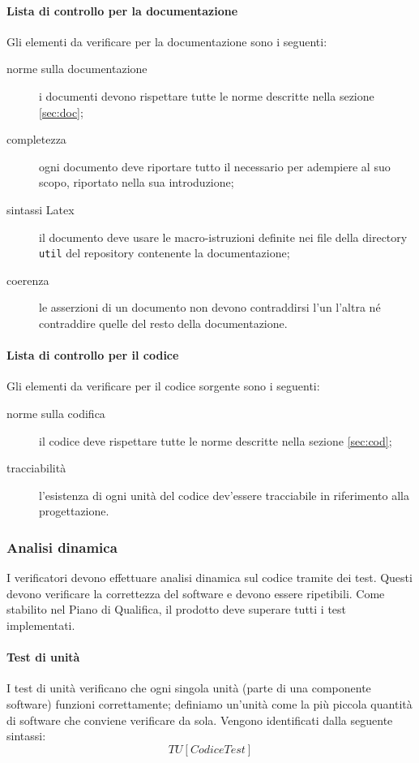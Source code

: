 	\paragraph{Lista di controllo per la documentazione} Gli elementi da verificare per la documentazione sono i seguenti:
	\begin{description} %
		\item[norme sulla documentazione] i documenti devono rispettare tutte le norme descritte nella sezione \ref{sec:doc};
		\item[completezza] ogni documento deve riportare tutto il necessario per adempiere al suo scopo, riportato nella sua introduzione;
		\item[sintassi Latex] il documento deve usare le macro-istruzioni definite nei file della directory \texttt{util} del repository contenente la documentazione;
		\item[coerenza] le asserzioni di un documento non devono contraddirsi l'un l'altra né contraddire quelle del resto della documentazione.
	\end{description}
	\paragraph{Lista di controllo per il codice} Gli elementi da verificare per il codice sorgente sono i seguenti:
	\begin{description} %
		\item[norme sulla codifica] il codice deve rispettare tutte le norme descritte nella sezione \ref{sec:cod};
		\item[tracciabilità] l'esistenza di ogni unità del codice dev'essere tracciabile in riferimento alla progettazione.
	\end{description}
 
	\subsubsection{Analisi dinamica} \label{sec:an_dinam}
	I verificatori devono effettuare analisi dinamica sul codice tramite dei test. Questi devono verificare la correttezza del software e devono essere ripetibili. Come stabilito nel Piano di Qualifica, il prodotto deve superare tutti i test implementati.

	\paragraph{Test di unità} I test di unità verificano che ogni singola unità (parte di una componente software) funzioni correttamente; definiamo un'unità come la più piccola quantità di software che conviene verificare da sola. Vengono identificati dalla seguente sintassi:
	\[TU[Codice Test]\]

